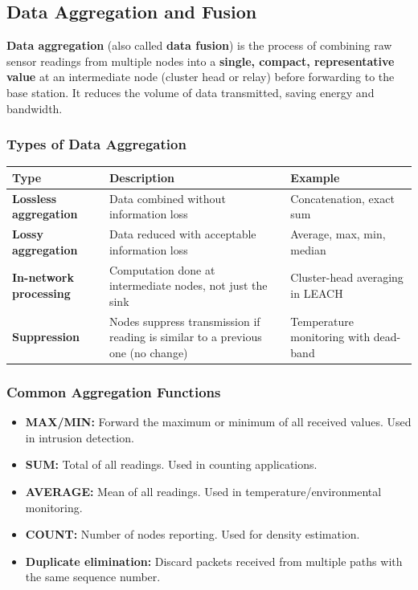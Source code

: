 \documentclass[12pt,a4paper]{article}
\renewcommand{\arraystretch}{1.45}
\begin{document}
\subsection{Data Aggregation and Fusion}

\begin{tcolorbox}[defbox, title={\textbf{Data Aggregation / Fusion --- Definition}}]
\textbf{Data aggregation} (also called \textbf{data fusion}) is the process of combining raw sensor readings from multiple nodes into a \textbf{single, compact, representative value} at an intermediate node (cluster head or relay) before forwarding to the base station. It reduces the volume of data transmitted, saving energy and bandwidth.
\end{tcolorbox}

\subsubsection*{Types of Data Aggregation}

\par\noindent
{\renewcommand{\arraystretch}{1.5}%
\begin{tabularx}{\linewidth}{|B{3.0cm}|Y|Y|}
\hline
\textbf{Type} & \textbf{Description} & \textbf{Example} \\
\hline
\textbf{Lossless aggregation} & Data combined without information loss & Concatenation, exact sum \\
\hline
\textbf{Lossy aggregation} & Data reduced with acceptable information loss & Average, max, min, median \\
\hline
\textbf{In-network processing} & Computation done at intermediate nodes, not just the sink & Cluster-head averaging in LEACH \\
\hline
\textbf{Suppression} & Nodes suppress transmission if reading is similar to a previous one (no change) & Temperature monitoring with dead-band \\
\hline
\end{tabularx}}

\subsubsection*{Common Aggregation Functions}
\begin{itemize}[leftmargin=*, itemsep=2pt]
  \item \textbf{MAX/MIN:} Forward the maximum or minimum of all received values. Used in intrusion detection.
  \item \textbf{SUM:} Total of all readings. Used in counting applications.
  \item \textbf{AVERAGE:} Mean of all readings. Used in temperature/environmental monitoring.
  \item \textbf{COUNT:} Number of nodes reporting. Used for density estimation.
  \item \textbf{Duplicate elimination:} Discard packets received from multiple paths with the same sequence number.
\end{itemize}
\end{document}
